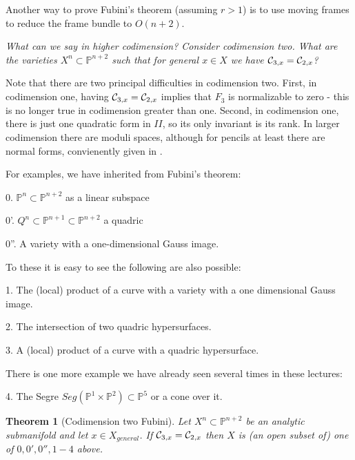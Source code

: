 \documentclass[11pt]{amsart}
\newtheorem{theorem}{Theorem}[section]
\theoremstyle{definition}
\theoremstyle{remark}
\numberwithin{equation}{section}
\def\pp#1{\mathbb P^{#1}}
\def\pp#1{{\mathbb P}^{#1}}
\begin{document}
Another way to prove Fubini's theorem (assuming $r>1$) is to use moving
frames to reduce the frame bundle to $O(n+2)$.

\medskip

{\it 
What can we say in higher codimension?
Consider codimension two. What are the varieties $X^n\subset \pp{n+2}$ such that
for general $x\in X$ we have 
${\mathcal C}_{3,x}={\mathcal C}_{2,x}$? 
}

\medskip

Note that there are two principal difficulties in codimension
two. First, in codimension one, having ${\mathcal C}_{3,x}={\mathcal C}_{2,x}$ implies
that $F_3$ is normalizable to zero - this is no longer true in codimension
greater than one. Second, in codimension one, there is just one 
quadratic form in $II$, so its only invariant is its rank. In larger
codimension there are moduli spaces, although for pencils at least
there are normal forms, convienently given in \cite{HP}.

\smallskip

\noindent For examples, we have inherited from Fubini's theorem:

\smallskip

0. $\pp n\subset \pp{n+2}$ as a linear subspace

0'. $Q^n\subset\pp{n+1}\subset\pp{n+2}$ a quadric

0''. A variety with a one-dimensional Gauss image.

\smallskip

\noindent To these it is easy to see the following are also possible:

\smallskip


1. The (local) product of a curve with a variety with a one dimensional 
Gauss image.

2. The intersection of two quadric hypersurfaces.

3. A (local) product of a curve with a quadric hypersurface.

\smallskip

\noindent There is one more example we have already seen several times
in these lectures:

\smallskip

4. The Segre $Seg(\pp 1\times \pp 2)\subset \pp 5$ or a
cone over it.

\smallskip

\begin{theorem}[Codimension two Fubini]\cite{LR} Let $X^n\subset\pp{n+2}$ be an
analytic submanifold   and let $x\in X_{general}$.
If ${\mathcal C}_{3,x}={\mathcal C}_{2,x}$ then $X$ is (an open subset of) one of
$0,0',0'',1-4$ above.
\end{theorem}
\end{document}

